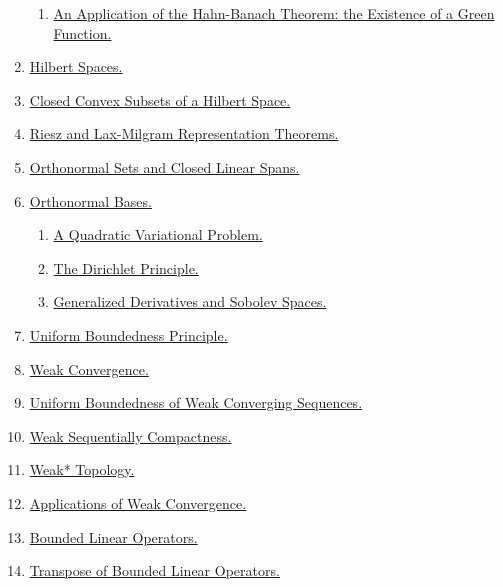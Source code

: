 \documentclass[11pt]{article}
\begin{document}
\begin{enumerate}
\begin{enumerate}
		\item \href{https://mp.weixin.qq.com/s/lwCOIuUz7nUMy5gIJ-VVTQ}{An Application of the Hahn-Banach Theorem: the Existence of a Green Function.}
	\end{enumerate}
	\item  \href{https://mp.weixin.qq.com/s/suNiTCRfo0QVdOgdJjUV8w}{Hilbert Spaces.} %
	\item  \href{https://mp.weixin.qq.com/s/4WtVNAURMgnHWEh3E1-A5w}{Closed Convex Subsets of a Hilbert Space.} %
	\item  \href{https://mp.weixin.qq.com/s/tGqgKIQtZKPd6wrIeiDT7A}{Riesz and Lax-Milgram Representation Theorems.} %
	\item  \href{https://mp.weixin.qq.com/s/hawZA03UB1LZVOisHtVSKQ}{Orthonormal Sets and Closed Linear Spans.} %
	\item  \href{https://mp.weixin.qq.com/s/39Q3WJ6eU54Py_4FPX3SMg}{Orthonormal Bases.} %
	\begin{enumerate}
		\item \href{https://mp.weixin.qq.com/s/7Of_lPt7Q4J5MAIXr9BwKQ}{A Quadratic Variational Problem.}
		\item \href{https://mp.weixin.qq.com/s/nFmQfYgAs4QWG75CmxesVw}{The Dirichlet Principle.}
		\item \href{https://mp.weixin.qq.com/s/pNR4OwdJpb3hU4jCwTBmaQ}{Generalized Derivatives and Sobolev Spaces.}
	\end{enumerate}
	\item  \href{https://mp.weixin.qq.com/s/70PNERNM_6nbTDwRqVuxOQ}{Uniform Boundedness Principle.} %
	\item  \href{https://mp.weixin.qq.com/s/h39rMcHqKCWtMjasDihOtw}{Weak Convergence.} %
	\item  \href{https://mp.weixin.qq.com/s/FgxaH8jHvSRsWYSjYR4jEg}{Uniform Boundedness of Weak Converging Sequences.} %
	\item  \href{https://mp.weixin.qq.com/s/EX5dyhXGruK5UMFxhaALJQ}{Weak Sequentially Compactness.} %
	\item  \href{https://mp.weixin.qq.com/s/rPCaEkj_DRckKKEaVoUSdg}{Weak* Topology.} %
	\item  \href{https://mp.weixin.qq.com/s/ocrmhjX_rKUINq9ikw6agA}{Applications of Weak Convergence.} %
	\item  \href{https://mp.weixin.qq.com/s/AHFTU9uyxE2qhzuVyS_cOQ}{Bounded Linear Operators.} %
	\item  \href{https://mp.weixin.qq.com/s/c79wuGVd9G0nOto5xkw_cQ}{Transpose of Bounded Linear Operators.} %

\end{enumerate}
\end{document}
